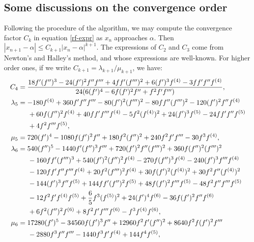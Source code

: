 \documentclass{article}
\begin{document}
\subsection{Some discussions on the convergence order}
Following the procedure of the algorithm, we may compute the convergence factor $C_{k}$ in equation \eqref{rf-expr} as $x_{n}$ approaches $\alpha$. Then $|x_{n+1}-\alpha|\leq C_{k+1}|x_{n}-\alpha|^{k+1}$. The expressions of $C_{2}$ and $C_{3}$ come from Newton's and Halley's method, and whose expressions are well-known. For higher order ones, if we write $C_{k+1}=\lambda_{k+1}/\mu_{k+1}$, we have:
\begin{align*}
C_{4} &= \frac{18f'(f'')^{3}-24(f')^{2}f''f'''+4ff'(f''')^{2}+6(f')^{3}f^{(4)}-3ff'f''f^{(4)}}{24(6(f')^{4}-6f(f')^{2}f''+f^{2}f'f''')},\\
\lambda_{5} &= -180f^{(4)}+360f'f''f'''-80(f')^{2}(f''')^{2}-80ff''(f''')^{2}-120(f')^{2}f''f^{(4)}\\
&\hspace{0.5cm}+60f(f'')^{2}f^{(4)} +40ff'f'''f^{(4)}-5f^{2}(f^{(4)})^{2}+24(f')^{3}f^{(5)}-24ff'f''f^{(5)}\\
&\hspace{0.5cm}+4f^{2}f'''f^{(5)},\\
\mu_{5} &= 720(f')^{4}-1080f(f')^{2}f''+180f^{2}(f'')^{2}+240f^{2}f'f'''-30f^{3}f^{(4)},\\ 
\lambda_{6}&= 540(f'')^{5}-1440f'(f'')^{3}f'''+720(f')^{2}f''(f''')^{2}+360f(f'')^{2}(f''')^{2}\\
&\hspace{0.5cm}-160ff'(f''')^{3}+540(f')^{2}(f'')^{2}f^{(4)}-270f(f'')^{3}f^{(4)}-240(f')^{3}f'''f^{(4)}\\
&\hspace{0.5cm}-120ff'f''f'''f^{(4)}+20f^{2}(f''')^{2}f^{(4)}+30f(f')^{2}(f^{(4)})^{2}+30f^{2}f''(f^{(4)})^{2}\\
&\hspace{0.5cm}-144(f')^{3}f''f^{(5)}+144ff'(f'')^{2}f^{(5)}+48f(f')^{2}f'''f^{(5)}-48f^{2}f''f'''f^{(5)}\\
&\hspace{0.5cm}-12f^{2}f'f^{(4)}f^{(5)}+\frac{6}{5}f^{3}(f^{(5)})^{2}+24(f')^{4}f^{(6)}-36f(f')^{2}f''f^{(6)}\\
&\hspace{0.5cm}+6f^{2}(f'')^{2}f^{(6)}+8f^{2}f'f'''f^{(6)}-f^{3}f^{(4)}f^{(6)},\\
\mu_{6} &= 17280 (f')^{5}-34560f(f')^{3}f''+12960f^{2}f'(f'')^{2}+8640f^{2}f(f')^{2}f'''\\
&\hspace{0.5cm}-2880f^{3}f''f'''-1440f^{3}f'f^{(4)}+144f^{4}f^{(5)},
\end{align*}
\end{document}
